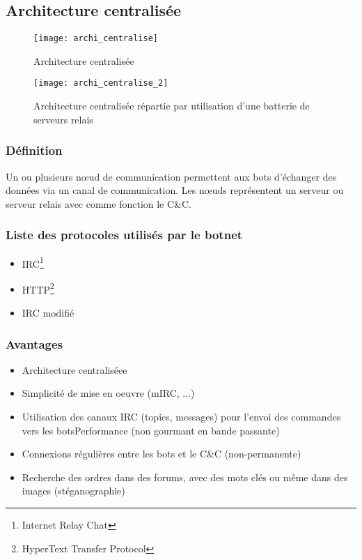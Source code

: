 \subsection[Architecture  centralisée]{Architecture  centralisée}
\begin{figure}[h]
	\centering
		\texttt{[image: archi\_centralise]}
	\label{fig:archicent}
	\caption[Architecture  centralisée]{Architecture  centralisée}
\end{figure}
\begin{figure}[h]
	\centering
		\texttt{[image: archi\_centralise\_2]}
	\label{fig:archicent2}
	\caption[Architecture  centralisée répartie par utilisation d’une batterie de serveurs relais]{Architecture  centralisée répartie par utilisation d’une batterie de serveurs relais}
\end{figure}

\subsubsection{Définition}
Un ou plusieurs nœud de communication permettent aux bots d'échanger des données via un canal de communication.
Les nœuds représentent un serveur ou serveur relais avec comme fonction le C\&C.

\subsubsection{Liste des protocoles utilisés par le botnet}
\begin{itemize}
	\item IRC\footnote{Internet Relay Chat}
	\item HTTP\footnote{HyperText Transfer Protocol}
	\item IRC modifié
\end{itemize}

\subsubsection{Avantages}
\begin{itemize}
	\item Architecture  centraliséee
	\item Simplicité de mise en oeuvre (mIRC, ...)
	\item Utilisation des canaux IRC (topics, messages) pour l’envoi des commandes vers les botsPerformance (non gourmant en bande passante)
	\item Connexions régulières entre les bots et le C\&C (non-permanente)
	\item Recherche des ordres dans des forums, avec des mots clés ou même dans des images (stéganographie)
\end{itemize}

